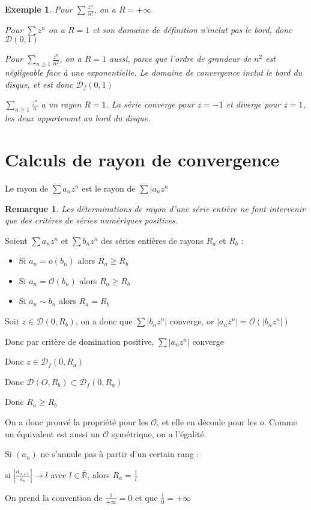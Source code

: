 \documentclass[a4paper,12pt]{book}
\newcommand{\Thr}[2]{\begin{tcolorbox}[sharp corners, colback=white,colframe=red!90!black!75, title=Théorème : #1]#2\end{tcolorbox}}
\newcommand{\Prop}[2]{\begin{tcolorbox}[sharp corners, colback=white,colframe=red!90!black!75, title=Proposition : #1]#2\end{tcolorbox}}
\newcommand{\Pre}[1]{\begin{tcolorbox}[sharp corners, colback=white,colframe=green!60!green!30!black!75, title=Preuve]#1\end{tcolorbox}}
\newtheorem{Exe}{Exemple}[section]
\newtheorem{Rem}{Remarque}[section]
\def\R{\mathbb{R}}
\begin{document}
\begin{Exe}
Pour $\sum\frac{z^n}{n!}$, on a $R=+\infty$ \par Pour $\sum z^n$ on a $R=1$ et son domaine de définition n'inclut pas le bord, donc $\mathcal{D}(0,1)$ \par Pour $\sum\limits_{n\geq 1}\frac{z^n}{n^2}$, on a $R=1$ aussi, parce que l'ordre de grandeur de $n^2$ est négligeable face à une exponentielle. Le domaine de convergence inclut le bord du disque, et est donc $\mathcal{D}_f(0,1)$  \par $\sum\limits_{n\geq 1}\frac{z^n}{n}$ a un rayon $R=1$. La série converge pour $z=-1$ et diverge pour $z=1$, les deux appartenant au bord du disque.
\end{Exe}

\section{Calculs de rayon de convergence}
\Prop{}{Le rayon de $\sum a_nz^n$ est le rayon de $\sum \vert a_n z^n$}
\begin{Rem}
Les déterminations de rayon d'une série entière ne font intervenir que des critères de séries numériques positives.
\end{Rem}
\Prop{Relations de comparaison}{Soient $\sum a_nz^n$ et $\sum b_nz^n$ des séries entières de rayons $R_a$ et $R_b$ :\begin{itemize}
\item Si $a_n = o(b_n)$ alors $R_a\geq R_b$
\item Si $a_n = \mathcal{O}(b_n)$ alors $R_a\geq R_b$
\item Si $a_n\sim b_n$ alors $R_a=R_b$
\end{itemize}}
\Pre{Soit $z\in\mathcal{D}(0,R_b)$, on a donc que $\sum \vert b_nz^n\vert$ converge, or $\vert a_nz^n\vert=\mathcal{O}(\vert b_nz^n\vert)$ \par Donc par critère de domination positive, $\sum\vert a_nz^n\vert$ converge \par Donc $z\in\mathcal{D}_f(0,R_a)$ \par Donc $\mathcal{D}(O,R_b)\subset \mathcal{D}_f(0,R_a)$ \par Donc $R_a\geq R_b$
\par On a donc prouvé la propriété pour les $\mathcal{O}$, et elle en découle pour les $o$. Comme un équivalent est aussi un $\mathcal{O}$ symétrique, on a l'égalité.}
\Thr{Critère de D'Alembert}{Si $(a_n)$ ne s'annule pas à partir d'un certain rang : \par si $\left\vert\frac{a_{n+1}}{a_n}\right\vert\to l$ avec $l\in\bar{\R}$, alors $R_a = \frac{1}{l}$
\par On prend la convention de $\frac{1}{+\infty}=0$ et que $\frac{1}{0}=+\infty$}
\end{document}
